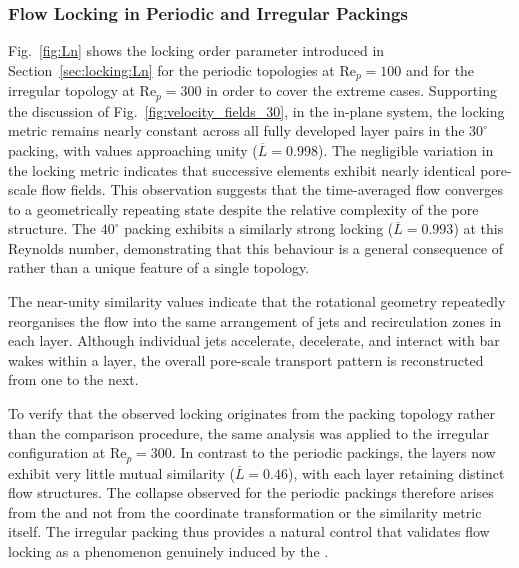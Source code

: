 \subsubsection{Flow Locking in Periodic and Irregular Packings}
\label{sec:locking:topologies}

Fig.~\ref{fig:Ln} shows the locking order parameter introduced in Section~\ref{sec:locking:Ln} for the periodic topologies at Re$_p = 100$ and for the irregular topology at Re$_p = 300$ in order to cover the extreme cases. Supporting the discussion of Fig.~\ref{fig:velocity_fields_30}, in the in-plane system, the locking metric remains nearly constant across all fully developed layer pairs in the $30^\circ$ packing, with values approaching unity ($\overline{L}=0.998$). The negligible variation in the locking metric indicates that successive elements exhibit nearly identical pore-scale flow fields. This observation suggests that the time-averaged flow converges to a geometrically repeating state despite the relative complexity of the pore structure. The $40^\circ$ packing exhibits a similarly strong locking ($\overline{L}=0.993$) at this Reynolds number, demonstrating that this behaviour is a general consequence of  rather than a unique feature of a single topology. 

The near-unity similarity values indicate that the rotational geometry repeatedly reorganises the flow into the same arrangement of jets and recirculation zones in each layer. Although individual jets accelerate, decelerate, and interact with bar wakes within a layer, the overall pore-scale transport pattern is reconstructed from one  to the next.

To verify that the observed locking originates from the packing topology rather than the comparison procedure, the same analysis was applied to the irregular configuration at Re$_p=300$. In contrast to the periodic packings, the layers now exhibit very little mutual similarity ($\overline{L}=0.46$), with each layer retaining distinct flow structures. The collapse observed for the periodic packings therefore arises from the  and not from the coordinate transformation or the similarity metric itself. The irregular packing thus provides a natural control that validates flow locking as a phenomenon genuinely induced by the .

